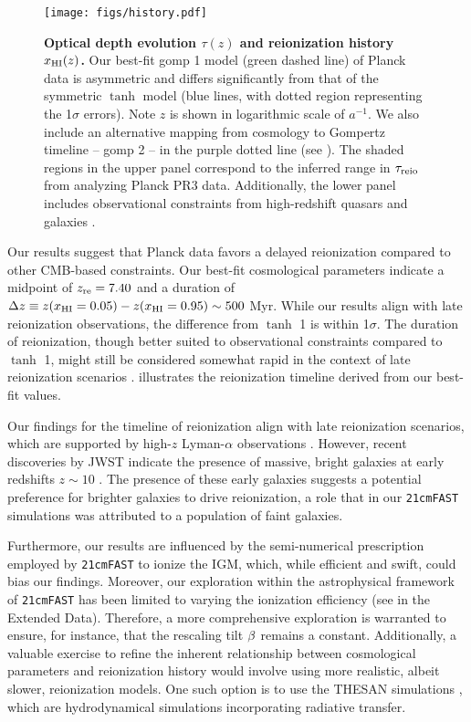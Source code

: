 \begin{figure}[tb]
\centering
\texttt{[image: figs/history.pdf]}
\caption{\textbf{Optical depth evolution $\tau(z)$ and reionization
history $x_{\mathrm{HI}}(z)$.}
Our best-fit gomp 1 model (green dashed line) of Planck data is
asymmetric and differs significantly from that of the symmetric $\tanh$
model (blue lines, with dotted region representing the 1$\sigma$
errors). Note $z$ is shown in logarithmic scale of $a^{-1}$.
We also include an alternative mapping from cosmology to Gompertz
timeline -- gomp 2 -- in the purple dotted line (see ).
The shaded regions in the upper panel correspond to the inferred range
in $\tau_{\mathrm{reio}}$ from analyzing Planck PR3 data.
Additionally, the lower panel includes observational constraints from
high-redshift quasars \cite{Greig2017, Banados2018, Davies2018,
Greig2019, Wang2020, Yang2020, Greig2022, Jin2023} and galaxies
\cite{Ouchi2010, Sobacchi2015, Mason2018, Mason2019, Hoag2019,
Mesinger2015}.}
\label{fig:history}
\end{figure}

Our results suggest that Planck data favors a delayed reionization
compared to other CMB-based constraints.
Our best-fit cosmological parameters indicate a midpoint of $z_{\mathrm{re}} =
7.40$ and a duration of $\Delta z \equiv z(x_{\mathrm{HI}} = 0.05) - z(x_{\mathrm{HI}} =
0.95) \sim 500 $ Myr.
While our results align with late reionization observations, the
difference from $\tanh$ 1 is within 1$\sigma$.
The duration of reionization, though better suited to observational
constraints compared to  $\tanh$ 1, might still be considered
somewhat rapid in the context of late reionization scenarios
\cite{Cain2021}.
 illustrates the reionization timeline derived
from our best-fit values.

Our findings for the timeline of reionization align with late
reionization scenarios, which are supported by high-$z$ Lyman-$\alpha$
observations \cite{Keating2020, Cain2021}.
However, recent discoveries by JWST indicate the presence of massive,
bright galaxies at early redshifts $z \sim 10$
\cite{Adams2023, Bradley2023, Donnan2023}.
The presence of these early galaxies suggests a potential preference for
brighter galaxies to drive reionization, a role that in our
\texttt{21cmFAST} simulations was attributed to a population of faint
galaxies.

Furthermore, our results are influenced by the semi-numerical
prescription employed by \texttt{21cmFAST} to ionize the IGM, which,
while efficient and swift, could bias our findings.
Moreover, our exploration within the astrophysical framework of
\texttt{21cmFAST} has been limited to varying the ionization efficiency
(see  in the Extended Data).
Therefore, a more comprehensive exploration is warranted to ensure, for
instance, that the rescaling tilt $\beta$ remains a constant.
Additionally, a valuable exercise to refine the inherent relationship
between cosmological parameters and reionization history would involve
using more realistic, albeit slower, reionization models.
One such option is to use the THESAN simulations \cite{Kannan2022},
which are hydrodynamical simulations incorporating radiative transfer.
